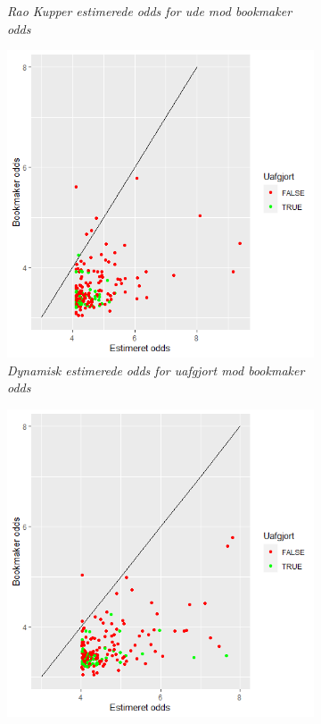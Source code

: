 \documentclass[11pt,a4paper]{article}
\begin{document}
\begin{figure}[ht!]
\begin{subfigure}[b]{0.4\linewidth}
    \caption{\textit{Rao Kupper estimerede odds for ude mod bookmaker odds}}
    \label{fig:StatUdeOdds}  
    \end{subfigure}
    \hspace{0.2cm}
    \begin{subfigure}[b]{0.4\textwidth}
    \includegraphics[width=\textwidth]{DynUafgjortOdds.png}
    \caption{\textit{Dynamisk estimerede odds for uafgjort mod bookmaker odds}}
    \label{fig:DynUafgjortOdds}  
    \end{subfigure}
          \hspace{0.2cm}
  \begin{subfigure}[b]{0.4\linewidth}
\includegraphics[width=\textwidth]{StatUafgjortOdds.png}

\end{subfigure}
\end{figure}
\end{document}
